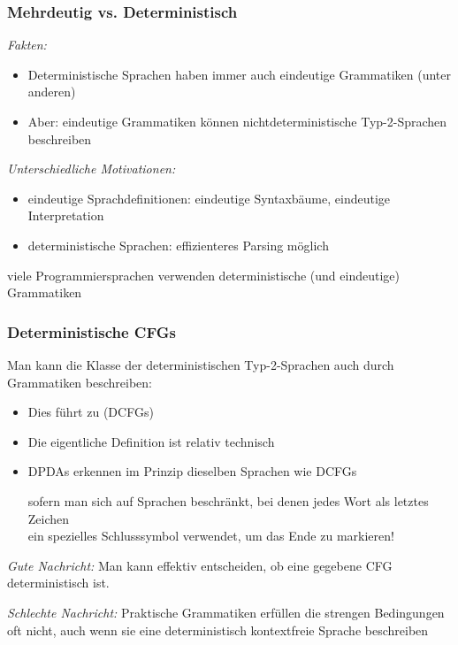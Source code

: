 \documentclass[aspectratio=1610,onlymath]{beamer}
\begin{document}
\begin{frame}\frametitle{Mehrdeutig vs. Deterministisch}

\emph{Fakten:}
\begin{itemize}
\item Deterministische Sprachen haben immer auch eindeutige Grammatiken (unter anderen)
\item Aber: eindeutige Grammatiken können nichtdeterministische Typ-2-Sprachen beschreiben
\end{itemize}
\bigskip\pause

\emph{Unterschiedliche Motivationen:}
\begin{itemize}
\item eindeutige Sprachdefinitionen: eindeutige Syntaxbäume, eindeutige Interpretation
\item deterministische Sprachen: effizienteres Parsing möglich
\end{itemize}
\alert{viele Programmiersprachen verwenden deterministische (und eindeutige) Grammatiken}

\end{frame}

\begin{frame}\frametitle{Deterministische CFGs}

Man kann die Klasse der deterministischen Typ-2-Sprachen auch durch Grammatiken
beschreiben:
\begin{itemize}
\item Dies führt zu  (DCFGs)
\item Die eigentliche Definition ist relativ technisch
\item DPDAs erkennen \alert{im Prinzip} dieselben Sprachen wie DCFGs\\[0.5ex]
{\tiny sofern man sich auf Sprachen beschränkt, bei denen
jedes Wort als letztes Zeichen\\ ein spezielles Schlusssymbol verwendet, um das Ende zu markieren!

}
\end{itemize}\pause

\emph{Gute Nachricht:} Man kann effektiv entscheiden, ob eine gegebene CFG deterministisch ist.\pause
\medskip

\emph{Schlechte Nachricht:} Praktische Grammatiken erfüllen die strengen Bedingungen oft nicht, auch wenn sie eine
deterministisch kontextfreie Sprache beschreiben

\end{frame}
\end{document}
